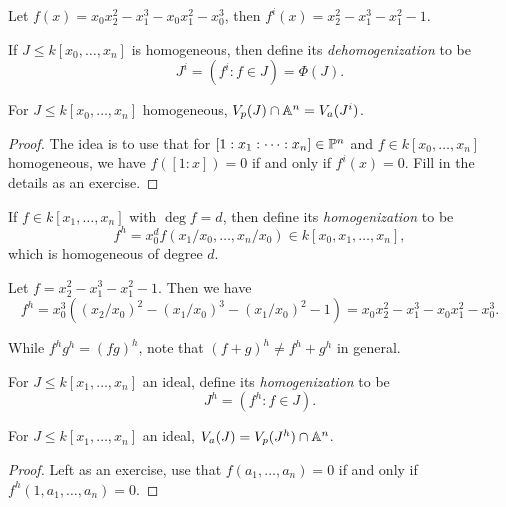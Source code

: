 \begin{example}
  Let $f(x) = x_0 x_2^2 - x_1^3 - x_0 x_1^2 - x_0^3$,
  then
  $f^i(x) = x_2^2 - x_1^3 - x_1^2 - 1$.
\end{example}

\begin{definition}
  If $J \le k[x_0, \dots, x_n]$
  is homogeneous, then define
  its \emph{dehomogenization} to be
  \[
    J^i = (f^i : f \in J)
    = \Phi(J).
  \]
\end{definition}

\begin{prop}
  For $J \le k[x_0, \dots, x_n]$
  homogeneous,
  $V_p(J) \cap \mathbb{A}^n = V_a(J^i)$.
\end{prop}

\begin{proof}
  The idea is to
  use that for
  $[1 : x_1 : \dots : x_n] \in \mathbb{P}^n$
  and $f \in k[x_0, \dots, x_n]$
  homogeneous, we have
  $f([1 : x]) = 0$ if and only if
  $f^i(x) = 0$. Fill in the details
  as an exercise.
\end{proof}

\begin{definition}
  If $f \in k[x_1, \dots, x_n]$
  with $\deg f  = d$, then define
  its \emph{homogenization} to be
  \[
    f^h = x_0^d f(x_1 / x_0, \dots, x_n / x_0) \in k[x_0, x_1, \dots, x_n],
  \]
  which is homogeneous of degree $d$.
\end{definition}

\begin{example}
  Let $f = x_2^2 - x_1^3 - x_1^2 - 1$.
  Then we have
  \[
    f^h = x_0^3 ((x_2 / x_0)^2 - (x_1 / x_0)^3 - (x_1 / x_0)^2 - 1)
    = x_0 x_2^2 - x_1^3 - x_0 x_1^2 - x_0^3.
  \]
\end{example}

\begin{remark}
  While $f^h g^h = (fg)^h$, note that
  $(f + g)^h \ne f^h + g^h$ in general.
\end{remark}

\begin{definition}
  For $J \le k[x_1, \dots, x_n]$ an ideal,
  define its \emph{homogenization} to be
  \[
    J^h = (f^h : f \in J).
  \]
\end{definition}

\begin{prop}
  For $J \le k[x_1, \dots, x_n]$ an ideal,
  $V_a(J) = V_p(J^h) \cap \mathbb{A}^n$.
\end{prop}

\begin{proof}
  Left as an exercise,
  use that
  $f(a_1, \dots, a_n) = 0$ if and only
  if $f^h(1, a_1, \dots, a_n) = 0$.
\end{proof}

